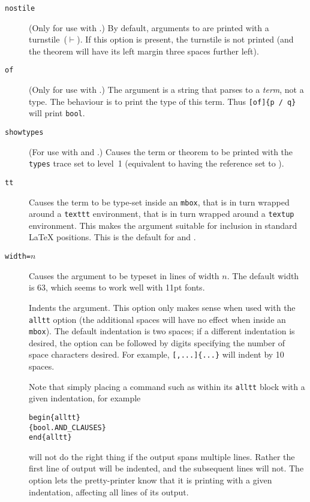 \begin{description}
\item[\texttt{nostile}] (Only for use with \holthm.)
%
By default, arguments to \holthm{} are printed with a turnstile~($\vdash$).
%
If this option is present, the turnstile is not printed (and the theorem will have its left margin three spaces further left).

\item[\texttt{of}] (Only for use with \holty.)
%
The argument is a string that parses to a \emph{term}, not a type.
%
The behaviour is to print the type of this term.
%
Thus \texttt{\holty{}[of]\{p /\bs{} q\}} will print \texttt{bool}.

\item[\texttt{showtypes}] (For use with \holthm{} and \holtm.)
%
Causes the term or theorem to be printed with the \texttt{types} trace set to level~1 (equivalent to having the  reference set to ).

\item[\texttt{tt}] %
Causes the term to be type-set inside an \texttt{\bs{}mbox}, that is in turn wrapped around a \texttt{\bs{}texttt} environment, that is in turn wrapped around a \texttt{\bs{}textup} environment.
%
This makes the argument suitable for inclusion in standard \LaTeX{} positions.  This is the default for \holtm{} and \holty.

\item[\texttt{width=}$n$] Causes the argument to be typeset in lines of width $n$.
%
The default width is $63$, which seems to work well with 11pt fonts.

\item[\texttt{\indentoption}] Indents the argument.
%
  This option only makes sense when used with the \texttt{alltt} option (the additional spaces will have no effect when inside an \texttt{\bs{}mbox}).
%
  The default indentation is two spaces; if a different indentation is desired, the option can be followed by digits specifying the number of space characters desired.
%
  For example, \texttt{\holthm{}[,...]\{...\}} will indent by 10 spaces.

  Note that simply placing a command such as \holthm{} within its \texttt{alltt} block with a given indentation, for example
\begin{alltt}
   \bs{}begin\{alltt\}
      \holthm\{bool.AND_CLAUSES\}
   \bs{}end\{alltt\}
\end{alltt}
will not do the right thing if the output spans multiple lines.
%
Rather the first line of \HOL{} output will be indented, and the subsequent lines will not.
%
The \texttt{\indentoption} option lets the pretty-printer know that it is printing with a given indentation, affecting all lines of its output.
\end{description}


